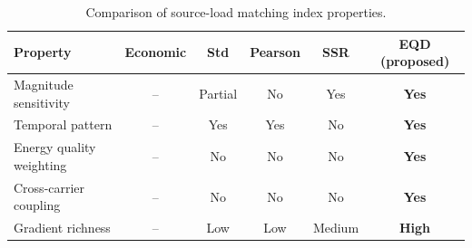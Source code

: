 \begin{table}[htbp]
\centering
\caption{Comparison of source-load matching index properties.}
\label{tab:index_comparison}
\small
\begin{tabular}{@{}lccccc@{}}
\toprule
Property & Economic & Std & Pearson & SSR & \textbf{EQD (proposed)} \\
\midrule
Magnitude sensitivity    & --  & Partial & No  & Yes & \textbf{Yes} \\
Temporal pattern         & --  & Yes     & Yes & No  & \textbf{Yes} \\
Energy quality weighting & --  & No      & No  & No  & \textbf{Yes} \\
Cross-carrier coupling   & --  & No      & No  & No  & \textbf{Yes} \\
Gradient richness        & --  & Low     & Low & Medium & \textbf{High} \\
\bottomrule
\end{tabular}
\end{table}
